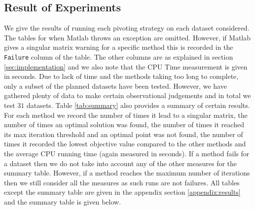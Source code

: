 \documentclass{standalone}
\begin{document}
  \subsection{Result of Experiments}
  We give the results of running each pivoting strategy on each dataset considered. The tables for when Matlab throws an exception are omitted. However, if Matlab gives a singular matrix warning for a specific method this is recorded in the \verb|Failure| column of the table. The other columns are as explained in section \ref{sec:implementation} and we also note that the CPU Time measurement is given in seconds. Due to lack of time and the methods taking too long to complete, only a subset of the planned datasets have been tested. However, we have gathered plenty of data to make certain observational judgements and in total we test $31$ datasets. Table \ref{tab:summary} also provides a summary of certain results. For each method we record the number of times it lead to a singular matrix, the number of times an optimal solution was found, the number of times it reached its max iteration threshold and an optimal point was not found, the number of times it recorded the lowest objective value compared to the other methods and the average CPU running time (again measured in seconds). If a method fails for a dataset then we do not take into account any of the other measures for the summary table. However, if a method reaches the maximum number of iterations then we still consider all the measures as such runs are not failures. All tables except the summary table are given in the appendix section \ref{appendix:results} and the summary table is given below.
\end{document}
